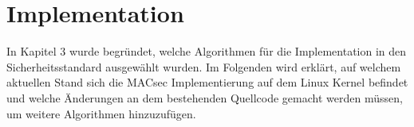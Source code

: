 
\chapter{Implementation}
\label{sec:implementation}

In Kapitel 3 wurde begründet, welche Algorithmen für die Implementation in den Sicherheitsstandard ausgewählt wurden. Im Folgenden wird erklärt, auf welchem aktuellen Stand sich die \gls{MACsec} Implementierung auf dem Linux Kernel befindet und welche Änderungen an dem bestehenden Quellcode gemacht werden müssen, um weitere Algorithmen hinzuzufügen.

